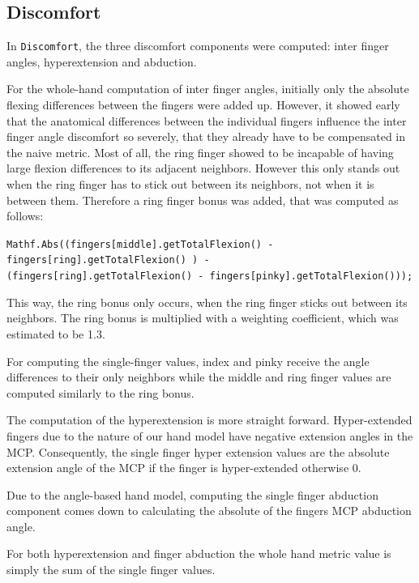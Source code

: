 \subsection{Discomfort}

In \texttt{Discomfort}, the three discomfort components were computed: inter finger angles, hyperextension and abduction.

For the whole-hand computation of inter finger angles, initially only the absolute flexing differences between the fingers were added up. However, it showed early that the anatomical differences between the individual fingers influence the inter finger angle discomfort so severely, that they already have to be compensated in the naive metric. Most of all, the ring finger showed to be incapable of having large flexion differences to its adjacent neighbors. However this only stands out when the ring finger has to stick out between its neighbors, not when it is between them. Therefore a ring finger bonus was added, that was computed as follows: 
\vspace{5pt}
\begin{center}
\texttt{Mathf.Abs((fingers[middle].getTotalFlexion() - fingers[ring].getTotalFlexion() ) - \\
(fingers[ring].getTotalFlexion() - fingers[pinky].getTotalFlexion()));}
\end{center}
\vspace{5pt}
This way, the ring bonus only occurs, when the ring finger sticks out between its neighbors. The ring bonus is multiplied with a weighting coefficient, which was estimated to be 1.3.

For computing the single-finger values, index and pinky receive the angle differences to their only neighbors while the middle and ring finger values are computed similarly to the ring bonus. 

The computation of the hyperextension is more straight forward. Hyper-extended fingers due to the nature of our hand model have negative extension angles in the MCP. Consequently, the single finger hyper extension values are the absolute extension angle of the MCP if the finger is hyper-extended otherwise 0. 

Due to the angle-based hand model, computing the single finger abduction component comes down to calculating the absolute of the fingers MCP abduction angle.

For both hyperextension and finger abduction the whole hand metric value is simply the sum of the single finger values. 

